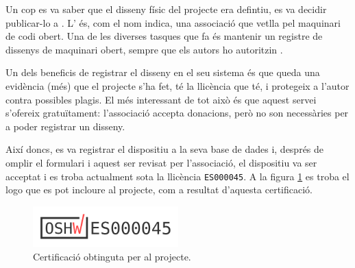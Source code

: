 Un cop es va saber que el disseny físic del projecte era defintiu, es va decidir
publicar-lo a . L' és, com el
nom indica, una associació que vetlla pel maquinari de codi obert. Una de les
diverses tasques que fa és mantenir un registre de dissenys de maquinari obert,
sempre que els autors ho autoritzin \cite{Oshwa}.

Un dels beneficis de registrar el disseny en el seu sistema és que queda una
evidència (més) que el projecte s'ha fet, té la llicència que té, i protegeix
a l'autor contra possibles plagis. El més interessant de tot això és que aquest
servei s'ofereix gratuïtament: l'associació accepta donacions, però no son
necessàries per a poder registrar un disseny.

Així doncs, es va registrar el dispositiu a la seva base de dades i, després
de omplir el formulari i aquest ser revisat per l'associació, el dispositiu
va ser acceptat i es troba actualment sota la llicència \verb|ES000045|.
A la figura \ref{fig:oshwa} es troba el logo que es pot incloure al projecte,
com a resultat d'aquesta certificació.

\begin{figure}[ht]
    \centering
    \includegraphics[width=0.5\textwidth]{images/oshwa.png}
    \caption{Certificació  obtinguta per al projecte.}
    \label{fig:oshwa}
\end{figure}

